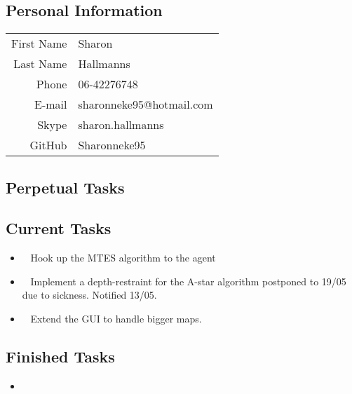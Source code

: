 \subsection{Personal Information}
\begin{table}[h!]
	\begin{tabular}{rl}
	    First Name 	& Sharon\\
	    Last Name	& Hallmanns\\
	    Phone		& 06-42276748\\
	    E-mail		& sharonneke95@hotmail.com\\
	    Skype		& sharon.hallmanns\\
	    GitHub		& Sharonneke95\\
    \end{tabular}
\end{table}

\subsection{Perpetual Tasks}

\subsection{Current Tasks}
\begin{itemize}
	\item~
		Hook up the MTES algorithm to the agent
	\item~
	Implement a depth-restraint for the A-star algorithm
		\subitem postponed to 19/05 due to sickness. Notified 13/05.
	\item~
	Extend the GUI to handle bigger maps.
\end{itemize}

\subsection{Finished Tasks}
\begin{itemize}
	\item
\end{itemize}